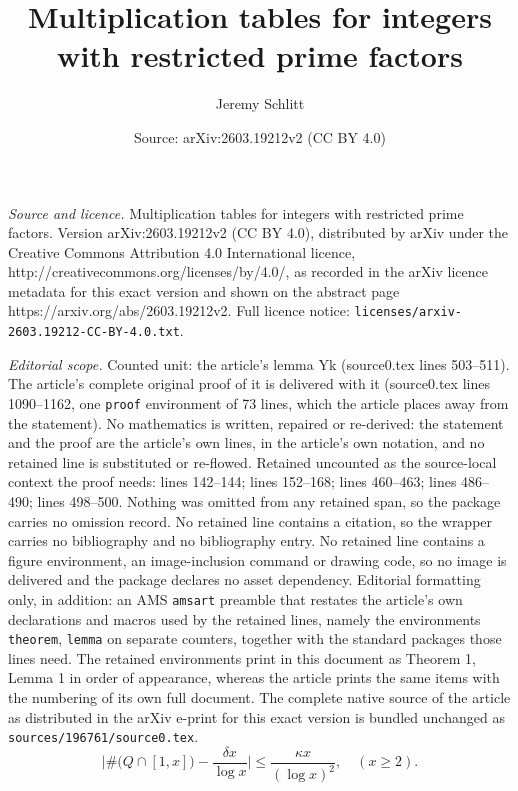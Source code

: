 \documentclass[10pt,a4paper]{amsart}
\title{Multiplication tables for integers with restricted prime factors}
\author{Jeremy Schlitt}
\date{Source: arXiv:2603.19212v2 (CC BY 4.0)}
\begin{document}
\maketitle

\noindent\emph{Source and licence.} Multiplication tables for integers with restricted prime factors. Version arXiv:2603.19212v2 (CC BY 4.0), distributed by arXiv under the Creative Commons Attribution 4.0 International licence, http://creativecommons.org/licenses/by/4.0/, as recorded in the arXiv licence metadata for this exact version and shown on the abstract page https://arxiv.org/abs/2603.19212v2. Full licence notice: \texttt{licenses/arxiv-2603.19212-CC-BY-4.0.txt}.\par\smallskip

\noindent\textit{Editorial scope.} Counted unit: the article's lemma Yk (source0.tex lines 503--511). The article's complete original proof of it is delivered with it (source0.tex lines 1090--1162, one \texttt{proof} environment of 73 lines, which the article places away from the statement). No mathematics is written, repaired or re-derived: the statement and the proof are the article's own lines, in the article's own notation, and no retained line is substituted or re-flowed.  Retained uncounted as the source-local context the proof needs: lines 142--144; lines 152--168; lines 460--463; lines 486--490; lines 498--500.  Nothing was omitted from any retained span, so the package carries no omission record.  No retained line contains a citation, so the wrapper carries no bibliography and no bibliography entry.  No retained line contains a figure environment, an image-inclusion command or drawing code, so no image is delivered and the package declares no asset dependency.  Editorial formatting only, in addition: an AMS \texttt{amsart} preamble that restates the article's own declarations and macros used by the retained lines, namely the environments \texttt{theorem}, \texttt{lemma} on separate counters, together with the standard packages those lines need.  The retained environments print in this document as Theorem 1, Lemma 1 in order of appearance, whereas the article prints the same items with the numbering of its own full document.  The complete native source of the article as distributed in the arXiv e-print for this exact version is bundled unchanged as \texttt{sources/196761/source0.tex}.
	\begin{equation}\label{definition of delta}
		\Big|\#\big(Q\cap[1,x]\big) - \frac{ \delta x}{\log x}\Big|\le \frac{\kappa x}{(\log x)^2}, \quad ( x\ge2 ).
	\end{equation}
\end{document}
